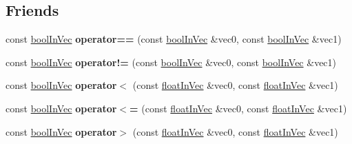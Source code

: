\subsection*{Friends}
\begin{DoxyCompactItemize}
\item 
\hypertarget{class_vectormath_1_1bool_in_vec_af7f7c8557b1401381f6ef219bbcf1507}{const \hyperlink{class_vectormath_1_1bool_in_vec}{bool\+In\+Vec} {\bfseries operator==} (const \hyperlink{class_vectormath_1_1bool_in_vec}{bool\+In\+Vec} \&vec0, const \hyperlink{class_vectormath_1_1bool_in_vec}{bool\+In\+Vec} \&vec1)}\label{class_vectormath_1_1bool_in_vec_af7f7c8557b1401381f6ef219bbcf1507}

\item 
\hypertarget{class_vectormath_1_1bool_in_vec_a7b3be8b2f8064495dba70f7e7ba3f47b}{const \hyperlink{class_vectormath_1_1bool_in_vec}{bool\+In\+Vec} {\bfseries operator!=} (const \hyperlink{class_vectormath_1_1bool_in_vec}{bool\+In\+Vec} \&vec0, const \hyperlink{class_vectormath_1_1bool_in_vec}{bool\+In\+Vec} \&vec1)}\label{class_vectormath_1_1bool_in_vec_a7b3be8b2f8064495dba70f7e7ba3f47b}

\item 
\hypertarget{class_vectormath_1_1bool_in_vec_aaf77cbfadf0d6df54184580f9b38fee2}{const \hyperlink{class_vectormath_1_1bool_in_vec}{bool\+In\+Vec} {\bfseries operator$<$} (const \hyperlink{class_vectormath_1_1float_in_vec}{float\+In\+Vec} \&vec0, const \hyperlink{class_vectormath_1_1float_in_vec}{float\+In\+Vec} \&vec1)}\label{class_vectormath_1_1bool_in_vec_aaf77cbfadf0d6df54184580f9b38fee2}

\item 
\hypertarget{class_vectormath_1_1bool_in_vec_a7de5fdb3a4cc2be5508e070d9e202281}{const \hyperlink{class_vectormath_1_1bool_in_vec}{bool\+In\+Vec} {\bfseries operator$<$=} (const \hyperlink{class_vectormath_1_1float_in_vec}{float\+In\+Vec} \&vec0, const \hyperlink{class_vectormath_1_1float_in_vec}{float\+In\+Vec} \&vec1)}\label{class_vectormath_1_1bool_in_vec_a7de5fdb3a4cc2be5508e070d9e202281}

\item 
\hypertarget{class_vectormath_1_1bool_in_vec_a2788b1aa4c31b395cc822e833383cea0}{const \hyperlink{class_vectormath_1_1bool_in_vec}{bool\+In\+Vec} {\bfseries operator$>$} (const \hyperlink{class_vectormath_1_1float_in_vec}{float\+In\+Vec} \&vec0, const \hyperlink{class_vectormath_1_1float_in_vec}{float\+In\+Vec} \&vec1)}\label{class_vectormath_1_1bool_in_vec_a2788b1aa4c31b395cc822e833383cea0}


\end{DoxyCompactItemize}
